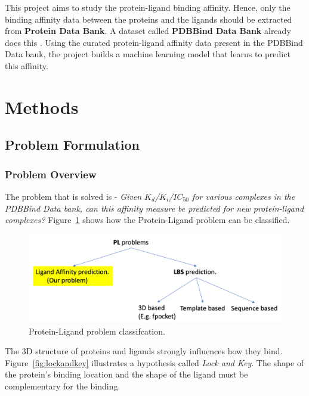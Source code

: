 \documentclass[11pt]{article}
\begin{document}
This project aims to study the protein-ligand binding affinity. Hence, only the binding affinity data between the proteins and the ligands should be extracted from \textbf{Protein Data Bank}.  A dataset called \textbf{PDBBind Data Bank} already does this
\cite{pdbbind_introduction}.
Using the curated protein-ligand affinity data present in the PDBBind Data bank, the project builds a machine learning model that learns to predict this affinity.

\section{Methods}
\subsection{Problem Formulation}
\subsubsection{Problem Overview}
\label{ProblemOverviewlabel}
The problem that is solved is - \textit{Given $K_d$/$K_i$/$IC_{50}$ for various complexes in the PDBBind Data bank,
can this affinity measure be predicted for new protein-ligand complexes?}
Figure~\ref{fig:plproblemclassification} shows how the Protein-Ligand problem can be classified.

\begin{figure}[htb]
  \centering
    \includegraphics[scale=0.35]{images/pl_problem_classification}
    \caption{Protein-Ligand problem classifcation.}
    \label{fig:plproblemclassification}
\end{figure}

The 3D structure of proteins and ligands strongly influences how they bind.
Figure~\ref{fig:lockandkey} illustrates a hypothesis called \textit{Lock and Key}.
The shape of the protein's binding location and the shape of the ligand must be complementary for the binding.
\end{document}
